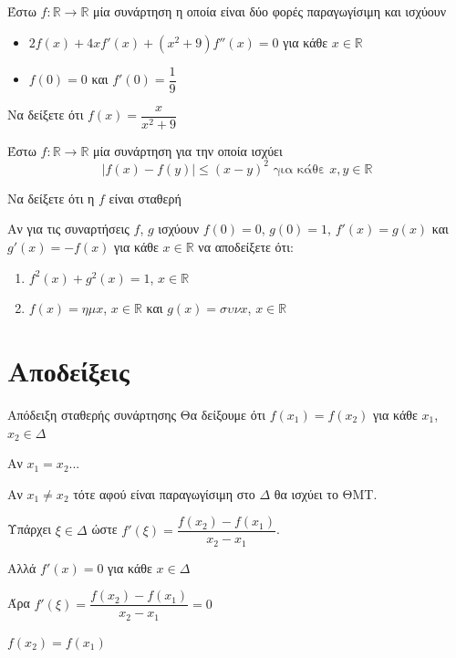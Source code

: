 \documentclass{presentation}
\begin{document}
\begin{askisi}
  Έστω $f:\mathbb{R}\to\mathbb{R}$ μία συνάρτηση η οποία είναι δύο φορές παραγωγίσιμη και ισχύουν
  \begin{itemize}
    \item $2f(x)+4xf'(x)+(x^2+9)f''(x)=0$ για κάθε $x\in\mathbb{R}$
    \item $f(0)=0$ και $f'(0)=\dfrac{1}{9}$
  \end{itemize}

  Να δείξετε ότι $f(x)=\dfrac{x}{x^2+9}$

\end{askisi}

\begin{askisi}
  Έστω $f:\mathbb{R}\to\mathbb{R}$ μία συνάρτηση για την οποία ισχύει
  $$|f(x)-f(y)|\le (x-y)^2 \text{ για κάθε } x,y\in\mathbb{R}$$

  Να δείξετε ότι η $f$ είναι σταθερή

\end{askisi}

\begin{askisi}
  Αν για τις συναρτήσεις $f$, $g$ ισχύουν $f(0)=0$, $g(0)=1$, $f'(x)=g(x)$ και $g'(x)=-f(x)$ για κάθε $x\in\mathbb{R}$ να αποδείξετε ότι:
  \begin{enumerate}
    \item<1-> $f^2(x)+g^2(x)=1$, $x\in\mathbb{R}$
    \item<2-> $f(x)=ημx$, $x\in\mathbb{R}$ και $g(x)=συνx$, $x\in\mathbb{R}$
  \end{enumerate}

\end{askisi}


\appendix

\section{Αποδείξεις}
\begin{frame}{Απόδειξη σταθερής συνάρτησης}
  Θα δείξουμε ότι $f(x_1)=f(x_2)$ για κάθε $x_1$, $x_2\in Δ$

   Αν $x_1=x_2$...

   Αν $x_1\ne x_2$ τότε αφού είναι παραγωγίσιμη στο $Δ$ θα ισχύει το ΘΜΤ.

   Υπάρχει $ξ\in Δ$ ώστε $f'(ξ)=\dfrac{f(x_2)-f(x_1)}{x_2-x_1}$.

   Αλλά $f'(x)=0$ για κάθε $x\in Δ$

   Άρα $f'(ξ)=\dfrac{f(x_2)-f(x_1)}{x_2-x_1}=0$

   $f(x_2)=f(x_1)$
\end{frame}

\moodle
\end{document}
